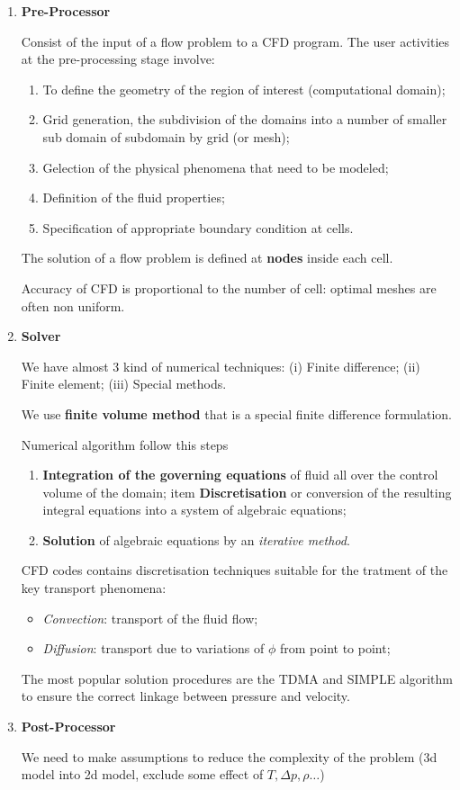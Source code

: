 \documentclass[a4paper, 15pt]{article}
\begin{document}
\begin{enumerate}
	\item \textbf{Pre-Processor}
	
	Consist of the input of a flow problem to a CFD program. The user activities at the pre-processing stage involve:
	\begin{enumerate}
		\item To define the geometry of the region of interest (computational domain);
		\item Grid generation, the subdivision of the domains into a number of smaller sub domain of subdomain by grid (or mesh);
		\item Gelection of the physical phenomena that need to be modeled;
	    \item Definition of the fluid properties;
	    \item Specification of appropriate boundary condition at cells.
	\end{enumerate} 
	The solution of a flow problem is defined at \textbf{nodes} inside each cell. 
	
	Accuracy of CFD is proportional to the number of cell: optimal meshes are often non uniform. 
	
	\item \textbf{Solver}
	
	We have almost 3 kind of numerical techniques: (i) Finite difference; (ii) Finite element; (iii) Special methods. \newline 
	
	We use \textbf{finite volume method} that is a special finite difference formulation. \newline 
	
	Numerical algorithm follow this steps
	\begin{enumerate}
		\item \textbf{Integration of the governing equations} of fluid all over the control volume of the domain;
		item \textbf{Discretisation} or conversion of the resulting integral equations into a system of algebraic equations;
		\item \textbf{Solution} of algebraic equations by an \textit{iterative method}.
	\end{enumerate}
	
	CFD codes contains discretisation techniques suitable for the tratment of the key transport phenomena: 
	\begin{itemize}
		\item \textit{Convection}: transport of the fluid flow;
		\item \textit{Diffusion}: transport due to variations of $\phi$ from point to point; 
	\end{itemize}
	
	The most popular solution procedures are the TDMA and SIMPLE algorithm to ensure the correct linkage between pressure and velocity.
	
	\item \textbf{Post-Processor}
	
	We need to make assumptions to reduce the complexity of the problem (3d model into 2d model, exclude some effect of $T, \Delta p, \rho\dots$) \newline 
\end{enumerate}
\end{document}

